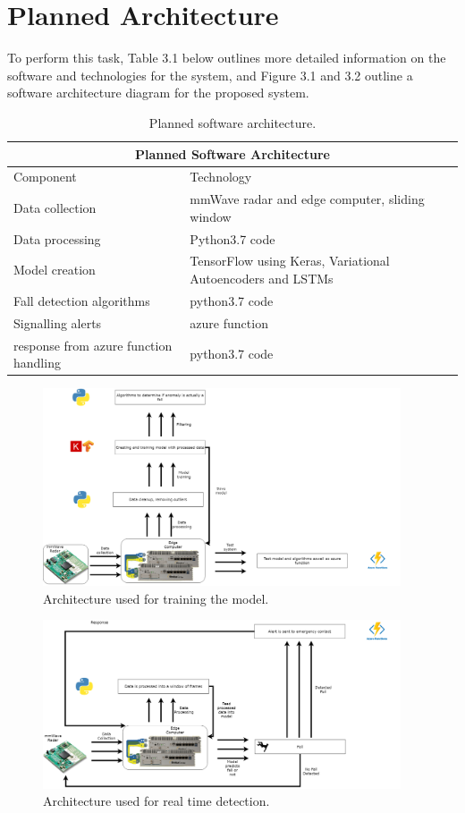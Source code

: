 \section{Planned Architecture}

To perform this task, Table 3.1 below outlines more detailed information on the software and technologies for the system, and Figure 3.1 and 3.2 outline a software architecture diagram for the proposed system. 

\begin{table}[H]
    \centering
    \begin{tabular}{ |p{4.5cm}|p{4.5cm}|}
     \hline
     \multicolumn{2}{|c|}{Planned Software Architecture} \\
     \hline
     Component & Technology\\
     \hline
     \hline
     Data collection&mmWave radar and edge computer, sliding window\\
     \hline
     Data processing&Python3.7 code\\
     \hline
     Model creation&TensorFlow using Keras, Variational Autoencoders and LSTMs\\
     \hline
     Fall detection algorithms&python3.7 code\\
     \hline
     Signalling alerts&azure function\\
     \hline
     response from azure function handling&python3.7 code\\
     \hline
    \end{tabular}
    \caption{Planned software architecture.}
\end{table}

\begin{figure}[H]
    \centering
    \includegraphics[width=400px, keepaspectratio]{archtrain.png}
    \vspace{1ex}%
    \caption{Architecture used for training the model.}
    \label{fig:my_label}
\end{figure}

\begin{figure}[H]
    \centering
    \includegraphics[width=400px, keepaspectratio]{archrealtime.png}
    \vspace{1ex}%
    \caption{Architecture used for real time detection.}
    \label{fig:my_label}
\end{figure}